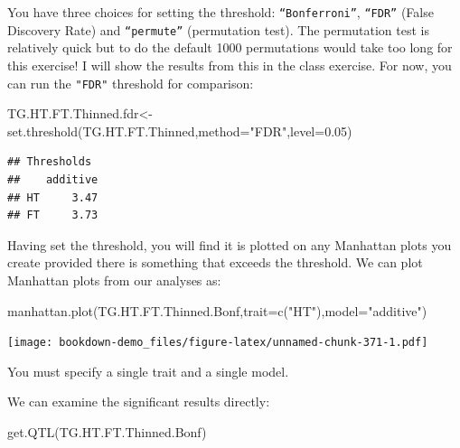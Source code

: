 \documentclass[
]{book}
\newenvironment{Shaded}{\begin{snugshade}}{\end{snugshade}}
\newcommand{\AttributeTok}[1]{\textcolor[rgb]{0.77,0.63,0.00}{#1}}
\newcommand{\FloatTok}[1]{\textcolor[rgb]{0.00,0.00,0.81}{#1}}
\newcommand{\FunctionTok}[1]{\textcolor[rgb]{0.00,0.00,0.00}{#1}}
\newcommand{\NormalTok}[1]{#1}
\newcommand{\OtherTok}[1]{\textcolor[rgb]{0.56,0.35,0.01}{#1}}
\newcommand{\StringTok}[1]{\textcolor[rgb]{0.31,0.60,0.02}{#1}}
\begin{document}
You have three choices for setting the threshold: \texttt{“Bonferroni”}, \texttt{“FDR”} (False Discovery Rate) and \texttt{“permute”} (permutation test). The permutation test is relatively quick but to do the default 1000 permutations would take too long for this exercise! I will show the results from this in the class exercise. For now, you can run the \texttt{"FDR"} threshold for comparison:

\begin{Shaded}
\begin{Highlighting}[]
\NormalTok{TG.HT.FT.Thinned.fdr}\OtherTok{\textless{}{-}}\FunctionTok{set.threshold}\NormalTok{(TG.HT.FT.Thinned,}\AttributeTok{method=}\StringTok{"FDR"}\NormalTok{,}\AttributeTok{level=}\FloatTok{0.05}\NormalTok{) }
\end{Highlighting}
\end{Shaded}

\begin{verbatim}
## Thresholds
##    additive
## HT     3.47
## FT     3.73
\end{verbatim}

Having set the threshold, you will find it is plotted on any Manhattan plots you create provided there is something that exceeds the threshold. We can plot Manhattan plots from our analyses as:

\begin{Shaded}
\begin{Highlighting}[]
\FunctionTok{manhattan.plot}\NormalTok{(TG.HT.FT.Thinned.Bonf,}\AttributeTok{trait=}\FunctionTok{c}\NormalTok{(}\StringTok{"HT"}\NormalTok{),}\AttributeTok{model=}\StringTok{"additive"}\NormalTok{) }
\end{Highlighting}
\end{Shaded}

\texttt{[image: bookdown-demo\_files/figure-latex/unnamed-chunk-371-1.pdf]}

You must specify a single trait and a single model.

We can examine the significant results directly:

\begin{Shaded}
\begin{Highlighting}[]
\FunctionTok{get.QTL}\NormalTok{(TG.HT.FT.Thinned.Bonf)}
\end{Highlighting}
\end{Shaded}
\end{document}
